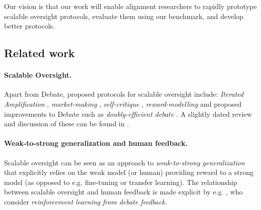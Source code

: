 


Our vision is that our work will enable alignment researchers to rapidly prototype scalable oversight protocols, evaluate them using our benchmark,
and develop better protocols.


\subsection{Related work}
\label{so:sec:related}

\paragraph{Scalable Oversight.} Apart from Debate, proposed protocols for scalable oversight include: \emph{Iterated Amplification} \citep{christiano2018IDA}, \emph{market-making} \citep{evanhubingerAISafetyMarket2020}, \emph{self-critique} \citep{saunders2022selfcritique}, \emph{reward-modelling} \citep{leike2018RewardModeling} and proposed improvements to Debate such as \emph{doubly-efficient debate} \citep{brown-cohenScalableAISafety2023}. A slightly dated review and discussion of these can be found in \citet{bowmanMeasuringProgressScalable2022}.

\paragraph{Weak-to-strong generalization and human feedback.} Scalable oversight can be seen as an approach to \emph{weak-to-strong generalization} \citep{sangWeak2Strong, langWeak2Strong} that explicitly relies on the weak model (or human) providing reward to a strong model (as opposed to e.g. fine-tuning or transfer learning). The relationship between scalable oversight and human feedback is made explicit by e.g. \citet{cheng2024RLHFDebate}, who consider \emph{reinforcement learning from debate feedback}.

